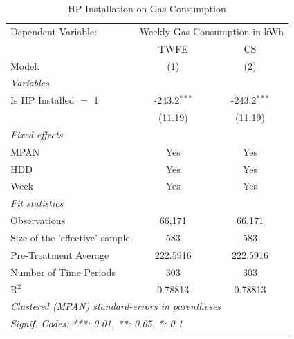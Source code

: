 
\begin{table}[htbp]
   \caption{\label{tab:hp-did-gas-conso} HP Installation on Gas Consumption}
   \centering
   \begin{tabular}{lcc}
      \tabularnewline \midrule \midrule
      Dependent Variable: & \multicolumn{2}{c}{Weekly Gas Consumption in kWh}\\
                                     & TWFE           & CS \\   
      Model:                         & (1)            & (2)\\  
      \midrule
      \emph{Variables}\\
      Is HP Installed $=$ 1          & -243.2$^{***}$ & -243.2$^{***}$\\   
                                     & (11.19)        & (11.19)\\   
      \midrule
      \emph{Fixed-effects}\\
      MPAN                           & Yes            & Yes\\  
      HDD                            & Yes            & Yes\\  
      Week                           & Yes            & Yes\\  
      \midrule
      \emph{Fit statistics}\\
      Observations                   & 66,171         & 66,171\\  
      Size of the 'effective' sample & 583            & 583\\  
      Pre-Treatment Average          & 222.5916       & 222.5916\\  
      Number of Time Periods         & 303            & 303\\  
      R$^2$                          & 0.78813        & 0.78813\\  
      \midrule \midrule
      \multicolumn{3}{l}{\emph{Clustered (MPAN) standard-errors in parentheses}}\\
      \multicolumn{3}{l}{\emph{Signif. Codes: ***: 0.01, **: 0.05, *: 0.1}}\\
   \end{tabular}
\end{table}


